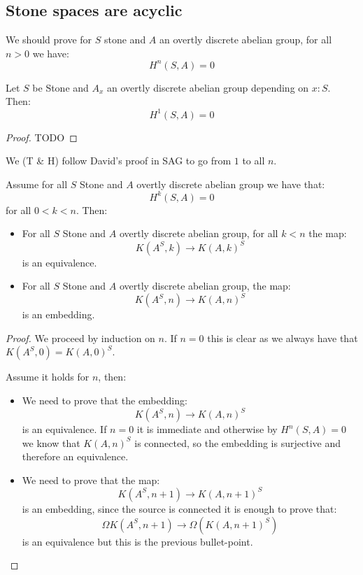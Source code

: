 \subsection{Stone spaces are acyclic}

We should prove for $S$ stone and $A$ an overtly discrete abelian group, for all $n>0$ we have:
\[H^n(S,A) = 0\]

\begin{lemma}\label{vanishing-1-cohomology-stone}
Let $S$ be Stone and $A_x$ an overtly discrete abelian group depending on $x:S$. Then:
\[H^1(S,A) = 0\]
\end{lemma}

\begin{proof}
TODO
\end{proof}

We (T \& H) follow David's proof in SAG to go from $1$ to all $n$.

\begin{lemma}\label{eilenberg-exponentials-auxiliary}
Assume for all $S$ Stone and $A$ overtly discrete abelian group we have that:
\[H^k(S,A) = 0\] 
for all $0<k<n$. Then:
\begin{itemize}
\item For all $S$ Stone and $A$ overtly discrete abelian group, for all $k<n$ the map:
\[K(A^S,k) \to K(A,k)^S\]
is an equivalence.
\item For all $S$ Stone and $A$ overtly discrete abelian group, the map:
\[K(A^S,n) \to K(A,n)^S\]
is an embedding.
\end{itemize}
\end{lemma}

\begin{proof}
We proceed by induction on $n$. If $n=0$ this is clear as we always have that $K(A^S,0) = K(A,0)^S$.

Assume it holds for $n$, then:
\begin{itemize} 
\item We need to prove that the embedding:
\[K(A^S,n) \to K(A,n)^S\]
is an equivalence. If $n=0$ it is immediate and otherwise by $H^n(S,A)=0$ we know that $K(A,n)^S$ is connected, so the embedding is surjective and therefore an equivalence. 
\item We need to prove that the map:
\[K(A^S,n+1) \to K(A,n+1)^S\]
is an embedding, since the source is connected it is enough to prove that:
\[\Omega K(A^S,n+1) \to \Omega (K(A,n+1)^S)\]
is an equivalence but this is the previous bullet-point.
\end{itemize}
\end{proof}

